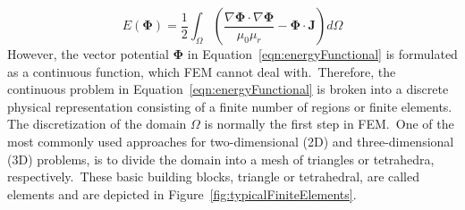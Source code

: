 \begin{equation}
	E(\mathbf{\Phi}) = \frac{1}{2}\int_{\Omega}\left(\frac{\nabla\mathbf{\Phi} \cdot \nabla\mathbf{\Phi}}{\mu_{0}\mu_{r}}-\mathbf{\Phi} \cdot \mathbf{J}\right)d\Omega
	\label{eqn:energyFunctional}
\end{equation}
However, the vector potential $\mathbf{\Phi}$ in Equation~\ref{eqn:energyFunctional} is formulated as a continuous function, which FEM cannot deal with.\ Therefore, the continuous problem in Equation~\ref{eqn:energyFunctional} is broken into a discrete physical representation consisting of a finite number of regions or finite elements.\\
The discretization of the domain $\Omega$ is normally the first step in FEM.\ One of the most commonly used approaches for two-dimensional (2D) and three-dimensional (3D) problems, is to divide the domain into a mesh of triangles or tetrahedra, respectively.\ These basic building blocks, triangle or tetrahedral, are called elements and are depicted in Figure~\ref{fig:typicalFiniteElements}.\
